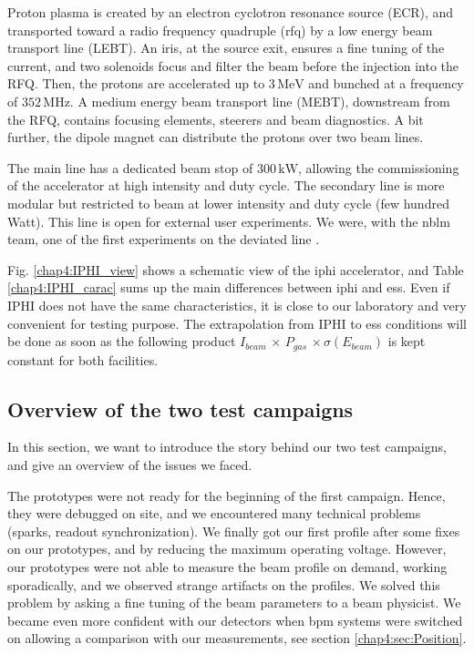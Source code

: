 \begin{refsection}
  
  Proton plasma is created by an electron cyclotron resonance source (ECR), and transported toward a radio frequency quadruple (\acrshort{rfq}) by a low energy beam transport line (LEBT).
  An iris, at the source exit, ensures a fine tuning of the current, and two solenoids focus and filter the beam before the injection into the RFQ.
  Then, the protons are accelerated up to $3\,\mathrm{MeV}$ and bunched at a frequency of $352\,\mathrm{MHz}$.
  A medium energy beam transport line (MEBT), downstream from the RFQ, contains focusing elements, steerers and beam diagnostics.
  A bit further, the dipole magnet can distribute the protons over two beam lines.

  The main line has a dedicated beam stop of $300\,\mathrm{kW}$, allowing the commissioning of the accelerator at high intensity and duty cycle.
  The secondary line is more modular but restricted to beam at lower intensity and duty cycle (few hundred Watt).
  This line is open for external user experiments.
  We were, with the \acrshort{nblm} team, one of the first experiments on the deviated line \cite{Senee:IPAC2018-TUPAF016}.

  Fig. \ref{chap4:IPHI_view} shows a schematic view of the \acrshort{iphi} accelerator, and Table \ref{chap4:IPHI_carac} sums up the main differences between \acrshort{iphi} and \acrshort{ess}. Even if IPHI does not have the same characteristics, it is close to our laboratory and very convenient for testing purpose. The extrapolation from IPHI to \acrshort{ess} conditions will be done as soon as the following product $I_{beam}\,\times\,P_{gas}\,\times\sigma(E_{beam})$ is kept constant for both facilities.

  

  \subsection{Overview of the two test campaigns}
  In this section, we want to introduce the story behind our two test campaigns, and give an overview of the issues we faced.

  

  The prototypes were not ready for the beginning of the first campaign.
  Hence, they were debugged on site, and we encountered many technical problems (sparks, readout synchronization).
  We finally got our first profile after some fixes on our prototypes, and by reducing the maximum operating voltage.
  However, our prototypes were not able to measure the beam profile on demand, working sporadically, and we observed strange artifacts on the profiles.
  We solved this problem by asking a fine tuning of the beam parameters to a beam physicist.
  We became even more confident with our detectors when \acrfull{bpm} systems were switched on allowing a comparison with our measurements, see section \ref{chap4:sec:Position}.



\end{refsection}
